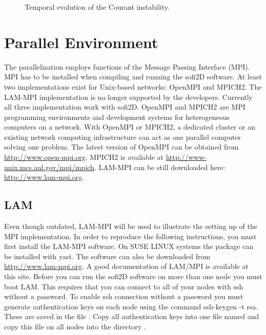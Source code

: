 \documentclass[11pt,onecolumn,oneside]{article}
\begin{document}
\begin{figure}[ht]
\begin{center}
\caption{\label{courandt_pics} Temporal evolution of the Courant instability.}
\end{center}
\end{figure}
\clearpage

\section{Parallel Environment}
The parallelization employs functions of the Message Passing Interface (MPI). MPI has to be installed when compiling and running the sofi2D software. At least two implementations exist for Unix-based networks: OpenMPI and MPICH2. The LAM-MPI implementation is no longer supported by the developers. Currently all three implementation work with sofi2D. OpenMPI and MPICH2 are MPI programming environments and development systems for heterogeneous computers on a network. With OpenMPI or MPICH2, a dedicated cluster or an existing network computing  infrastructure can act as one parallel computer solving one problem. The latest version of OpenMPI can be obtained from \url{http://www.open-mpi.org}. MPICH2 is available at \url{http://www-unix.mcs.anl.gov/mpi/mpich}. LAM-MPI can be still downloaded here: \url{http://www.lam-mpi.org}.

\subsection{LAM}
Even though outdated, LAM-MPI will be used to illustrate the setting up of the MPI implementation. In order to reproduce the following instructions, you must first install the LAM-MPI software. 
On SUSE LINUX systems the package can be installed with yast. The software can also be downloaded from \url{http://www.lam-mpi.org}. A good documentation of LAM/MPI is available at this site. Before you can run the sofi2D software on more than one node you must boot LAM. This requires that you can connect to all of your nodes with ssh without a password. To enable ssh connection without a password you must generate authentication keys on each node using the command ssh-keygen -t rsa. These are saved in the file . Copy all authentication keys into one file named  and copy this file on all nodes into the directory . 
\end{document}
